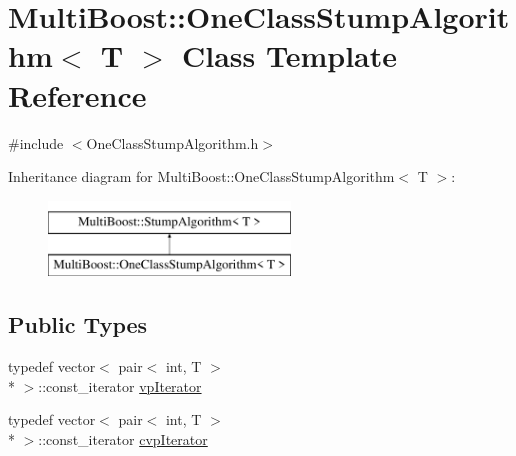 \hypertarget{classMultiBoost_1_1OneClassStumpAlgorithm}{\section{Multi\-Boost\-:\-:One\-Class\-Stump\-Algorithm$<$ T $>$ Class Template Reference}
\label{classMultiBoost_1_1OneClassStumpAlgorithm}
}


{\ttfamily \#include $<$One\-Class\-Stump\-Algorithm.\-h$>$}

Inheritance diagram for Multi\-Boost\-:\-:One\-Class\-Stump\-Algorithm$<$ T $>$\-:\begin{figure}[H]
\begin{center}
\leavevmode
\includegraphics[height=2.000000cm]{classMultiBoost_1_1OneClassStumpAlgorithm}
\end{center}
\end{figure}
\subsection*{Public Types}
\begin{DoxyCompactItemize}
\item 
typedef vector$<$ pair$<$ int, T $>$\\*
 $>$\-::const\-\_\-iterator \hyperlink{classMultiBoost_1_1OneClassStumpAlgorithm_a5ad69d710488cdd1aa350baf36c13384}{vp\-Iterator}
\item 
typedef vector$<$ pair$<$ int, T $>$\\*
 $>$\-::const\-\_\-iterator \hyperlink{classMultiBoost_1_1OneClassStumpAlgorithm_a814d7366f9bcbcfd50a04ea0102ac6d9}{cvp\-Iterator}
\end{DoxyCompactItemize}
